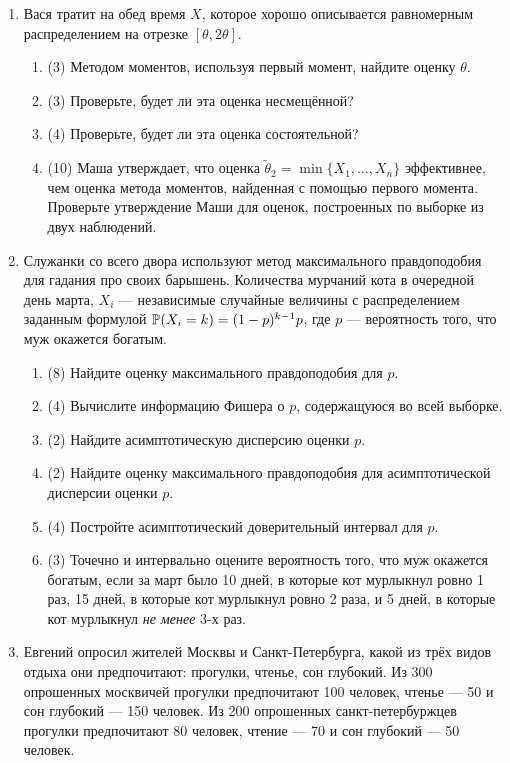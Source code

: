\begin{enumerate}
  \item Вася тратит на обед время $X$, которое хорошо описывается равномерным распределением на отрезке $[ \theta, 2 \theta ]$. 

  \begin{enumerate}
  \item (3) Методом моментов, используя первый момент, найдите оценку $\theta$.
  \item (3) Проверьте, будет ли эта оценка несмещённой?
  \item (4) Проверьте, будет ли эта оценка состоятельной?
  \item (10) Маша утверждает, что оценка $\tilde{\theta}_2 = \min\{X_1, \ldots, X_n\}$ эффективнее, чем оценка метода моментов, найденная с помощью первого момента. 
  Проверьте утверждение Маши для оценок, построенных по выборке из двух наблюдений.
  \end{enumerate}
  
  \item Служанки со всего двора используют метод максимального правдоподобия для 
  гадания про своих барышень. 
  Количества мурчаний кота в очередной день марта, $X_i$ —
  независимые случайные величины с распределением заданным формулой $\P(X_i = k) = (1-p)^{k-1}p$,
  где $p$ — вероятность того, что муж окажется богатым. 
  
  \begin{enumerate}
  \item  (8) Найдите оценку максимального правдоподобия для $p$.
  \item  (4) Вычислите информацию Фишера о $p$, содержащуюся во всей выборке.
  \item  (2) Найдите асимптотическую дисперсию оценки $p$.
  \item  (2) Найдите оценку максимального правдоподобия для асимптотической дисперсии оценки $p$.
  \item  (4) Постройте асимптотический доверительный интервал для $p$.
  \item  (3) Точечно и интервально оцените вероятность того, что муж окажется богатым, если за март было 10 дней, в которые кот мурлыкнул ровно 1 раз, 15 дней, в которые кот мурлыкнул ровно 2 раза,
  и 5 дней, в которые кот мурлыкнул \textit{не менее} 3-х раз. 
  \end{enumerate}
  
\item  Евгений опросил жителей Москвы и Санкт-Петербурга,
  какой из трёх видов отдыха они предпочитают: прогулки, чтенье, сон глубокий. 
  Из 300 опрошенных москвичей прогулки предпочитают 100 человек, чтенье — 50 и сон глубокий — 150 человек.
  Из 200 опрошенных санкт-петербуржцев прогулки предпочитают 80 человек, чтение — 70 и сон глубокий — 50 человек. 
  

\end{enumerate}
